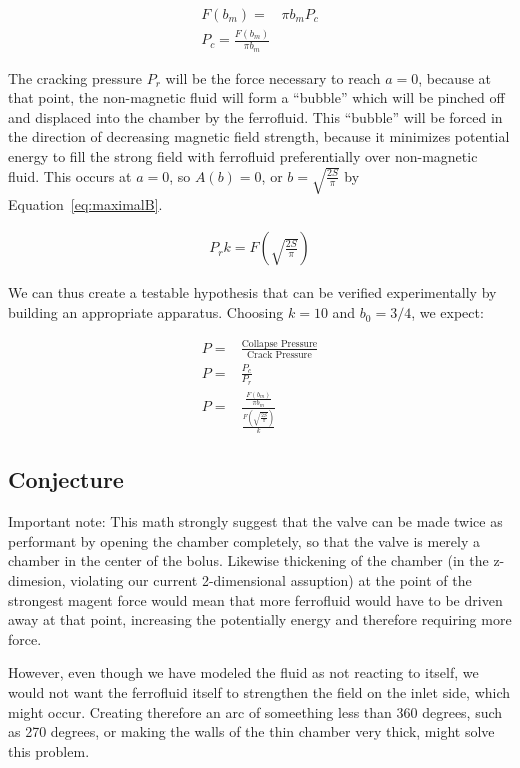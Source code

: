 \documentclass[]{asme2ej}
\begin{document}
\begin{align}
  F(b_m) = & \pi b_m P_c \\
  P_c = \frac{F(b_m)}{\pi b_m}
\end{align}

The cracking pressure $P_r$ will be the force necessary to reach $a = 0$, because at that point,
the non-magnetic fluid will form a ``bubble'' which will be pinched off and displaced into the chamber
by the ferrofluid. This ``bubble'' will be forced in the direction of decreasing magnetic field strength,
because it minimizes potential energy to fill the strong field with ferrofluid preferentially over
non-magnetic fluid. This occurs at $a = 0$, so $A(b) = 0$, or $b = \sqrt{\frac{2S}{\pi}}$ by Equation~\ref{eq:maximalB}.

\begin{align}
  P_r k = F(\sqrt{\frac{2S}{\pi}})
\end{align}

We can thus create a testable hypothesis that can be verified experimentally by building an appropriate
apparatus. Choosing $k = 10$ and $b_0 = 3/4$, we expect:

\begin{align}
  P = & \frac{\text{Collapse Pressure}}{\text{Crack Pressure}} \\
  P = & \frac{P_c}{P_r} \\
  P = & \frac{\frac{F(b_m)}{\pi b_m}}{\frac{F(\sqrt{\frac{2S}{\pi}})}{k}}
\end{align}


\subsection{Conjecture}

Important note: This math strongly suggest that the valve can be
made twice as performant by opening the chamber completely, so that the
valve is merely a chamber in the center of the bolus.
Likewise thickening of the chamber (in the z-dimesion, violating
our current 2-dimensional assuption) at the point of the strongest
magent force would mean that more ferrofluid would have to be driven
away at that point, increasing the potentially energy and therefore
requiring more force.

However, even though we have modeled the fluid as not reacting to itself,
we would not want the ferrofluid itself
to strengthen the field on the inlet side, which might occur. Creating
therefore an arc of someething less than 360 degrees, such as 270 degrees,
or making the walls of the thin chamber very thick, might solve this problem.
\end{document}
